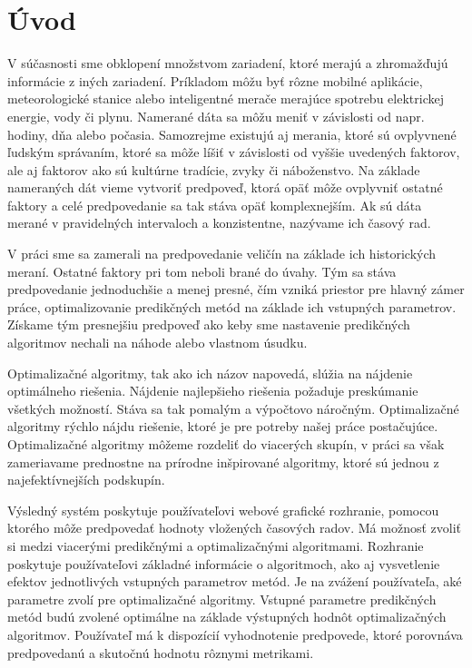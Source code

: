 \documentclass[a4paper,slovak,12pt,appendix]{article}
\begin{document}
\section{Úvod}
V súčasnosti sme obklopení množstvom zariadení, ktoré merajú a zhromažďujú
informácie z iných zariadení. Príkladom môžu byť rôzne mobilné aplikácie,
meteorologické stanice alebo inteligentné merače merajúce spotrebu elektrickej
energie, vody či plynu. Namerané dáta sa môžu meniť v závislosti od napr.
hodiny, dňa alebo počasia. Samozrejme existujú aj merania, ktoré sú ovplyvnené
ľudským správaním, ktoré sa môže líšiť v závislosti od vyššie uvedených
faktorov, ale aj faktorov ako sú kultúrne tradície, zvyky či náboženstvo. Na
základe nameraných dát vieme vytvoriť predpoveď, ktorá opäť môže ovplyvniť
ostatné faktory a celé predpovedanie sa tak stáva opäť komplexnejším. Ak sú
dáta merané v pravidelných intervaloch a konzistentne, nazývame ich časový rad.

V práci sme sa zamerali na predpovedanie veličín na základe ich historických
meraní. Ostatné faktory pri tom neboli brané do úvahy. Tým sa stáva
predpovedanie jednoduchšie a menej presné, čím vzniká priestor pre hlavný zámer
práce, optimalizovanie predikčných metód na základe ich vstupných parametrov.
Získame tým presnejšiu predpoveď ako keby sme nastavenie predikčných algoritmov
nechali na náhode alebo vlastnom úsudku.

Optimalizačné algoritmy, tak ako ich názov napovedá, slúžia na nájdenie
optimálneho riešenia. Nájdenie najlepšieho riešenia požaduje preskúmanie
všetkých možností. Stáva sa tak pomalým a výpočtovo náročným. Optimalizačné
algoritmy rýchlo nájdu riešenie, ktoré je pre potreby našej práce postačujúce.
Optimalizačné algoritmy môžeme rozdeliť do viacerých skupín, v práci sa však
zameriavame prednostne na prírodne inšpirované algoritmy, ktoré sú jednou
z najefektívnejších podskupín.

Výsledný systém poskytuje používateľovi webové grafické rozhranie, pomocou
ktorého môže predpovedať hodnoty vložených časových radov. Má možnosť zvoliť si
medzi viacerými predikčnými a optimalizačnými algoritmami. Rozhranie poskytuje
používateľovi základné informácie o algoritmoch, ako aj vysvetlenie efektov
jednotlivých vstupných parametrov metód. Je na zvážení používateľa, aké
parametre zvolí pre optimalizačné algoritmy. Vstupné parametre predikčných
metód budú zvolené optimálne na základe výstupných hodnôt optimalizačných
algoritmov. Používateľ má k dispozícií vyhodnotenie predpovede, ktoré porovnáva
predpovedanú a skutočnú hodnotu rôznymi metrikami.
\end{document}
